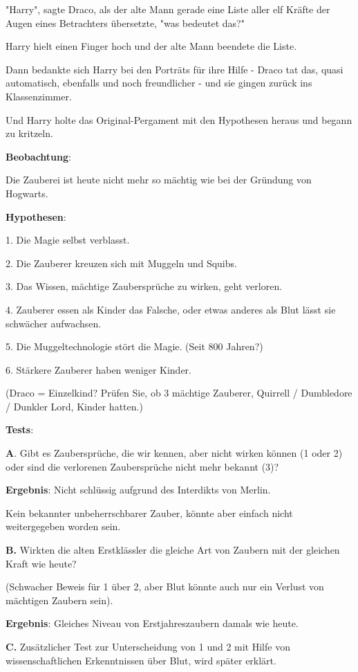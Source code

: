 {"Harry", sagte Draco, als der alte Mann gerade eine Liste aller elf Kräfte der Augen eines Betrachters übersetzte, "was bedeutet das?"

Harry hielt einen Finger hoch und der alte Mann beendete die Liste.

Dann bedankte sich Harry bei den Porträts für ihre Hilfe - Draco tat das, quasi automatisch, ebenfalls und noch freundlicher - und sie gingen zurück ins Klassenzimmer.

Und Harry holte das Original-Pergament mit den Hypothesen heraus und begann zu kritzeln.

\textbf{Beobachtung}:

Die Zauberei ist heute nicht mehr so mächtig wie bei der Gründung von Hogwarts.

\textbf{Hypothesen}:

1. Die Magie selbst verblasst.

2. Die Zauberer kreuzen sich mit Muggeln und Squibs.

3. Das Wissen, mächtige Zaubersprüche zu wirken, geht verloren.

4. Zauberer essen als Kinder das Falsche, oder etwas anderes als Blut lässt sie schwächer aufwachsen.

5. Die Muggeltechnologie stört die Magie. (Seit 800 Jahren?)

6. Stärkere Zauberer haben weniger Kinder.

(Draco = Einzelkind? Prüfen Sie, ob 3 mächtige Zauberer, Quirrell / Dumbledore / Dunkler Lord, Kinder hatten.)

\textbf{Tests}:

\textbf{A}. Gibt es Zaubersprüche, die wir kennen, aber nicht wirken können (1 oder 2) oder sind die verlorenen Zaubersprüche nicht mehr bekannt (3)?

\textbf{Ergebnis}: Nicht schlüssig aufgrund des Interdikts von Merlin.

Kein bekannter unbeherrschbarer Zauber, könnte aber einfach nicht weitergegeben worden sein.

\textbf{B.} Wirkten die alten Erstklässler die gleiche Art von Zaubern mit der gleichen Kraft wie heute?

(Schwacher Beweis für 1 über 2, aber Blut könnte auch nur ein Verlust von mächtigen Zaubern sein).

\textbf{Ergebnis}: Gleiches Niveau von Erstjahreszaubern damals wie heute.

\textbf{C.} Zusätzlicher Test zur Unterscheidung von 1 und 2 mit Hilfe von wissenschaftlichen Erkenntnissen über Blut, wird später erklärt.

}
